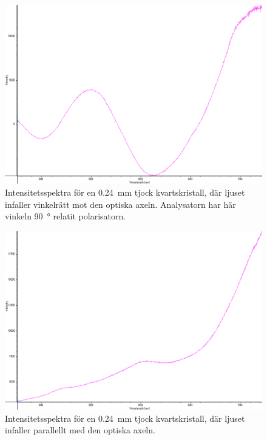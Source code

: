 \documentclass[a4paper]{article}
\begin{document}
\FloatBarrier
\begin{figure}[h!]
	\centering
	\includegraphics[width=\linewidth]{data/spektra_180_kristall1_270_inv}
	\caption{Intensitetsspektra för en \SI{0.24}{\milli\m} tjock kvartskristall, där ljuset infaller vinkelrätt mot den optiska axeln. Analysatorn har här vinkeln \SI{+90}{\degree} relatit polarisatorn.}
	\label{fig:}
\end{figure}
\FloatBarrier

\FloatBarrier
\begin{figure}[h!]
	\centering
	\includegraphics[width=\linewidth]{data/spektra_kristall1_optAx_inv}
	\caption{Intensitetsspektra för en \SI{0.24}{\milli\m} tjock kvartskristall, där ljuset infaller parallellt med den optiska axeln.}
	\label{fig:}
\end{figure}
\FloatBarrier
\end{document}
